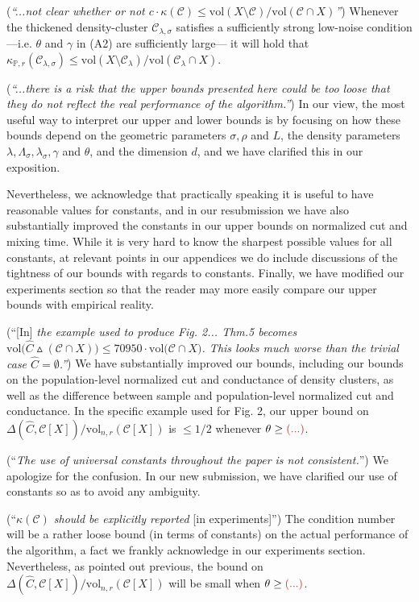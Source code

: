 \documentclass{article}
\newcommand{\vol}{\mathrm{vol}}
\newcommand{\1}{\mathbf{1}}
\newcommand{\mc}[1]{\mathcal{#1}}
\newcommand{\Pbb}{\mathbb{P}}
\newcommand{\wh}[1]{\widehat{#1}}
\theoremstyle{alden}
\theoremstyle{aldenthm}
\theoremstyle{definition}
\theoremstyle{remark}
\begin{document}
(\textit{``...not clear whether or not $c \cdot \kappa(\mc{C}) \leq \vol(X \setminus \mc{C}) / \vol(\mc{C} \cap X)$''}) Whenever the thickened density-cluster $\mc{C}_{\lambda,\sigma}$ satisfies a sufficiently strong low-noise condition---i.e. $\theta$ and $\gamma$ in (A2) are sufficiently large--- it will hold that $\kappa_{\Pbb,r}(\mc{C}_{\lambda,\sigma}) \leq \vol(X \setminus \mc{C}_{\lambda}) / \vol(\mc{C}_{\lambda} \cap X)$.

(\textit{``...there is a risk that the upper bounds presented here could be too loose that they do not reflect the real performance of the algorithm.''}) In our view, the most useful way to interpret our upper and lower bounds is by focusing on how these bounds depend on the geometric parameters $\sigma, \rho$ and $L$, the density parameters $\lambda,\Lambda_{\sigma},\lambda_{\sigma},\gamma$ and $\theta$, and the dimension $d$, and we have clarified this in our exposition. 

Nevertheless, we acknowledge that practically speaking it is useful to have reasonable values for constants, and in our resubmission we have also substantially improved the constants in our upper bounds on normalized cut and mixing time. While it is very hard to know the sharpest possible values for all constants, at relevant points in our appendices we do include discussions of the tightness of our bounds with regards to constants. Finally, we have modified our experiments section so that the reader may more easily compare our upper bounds with empirical reality.

(``[In] \textit{the example used to produce Fig. 2... Thm.5 becomes $\vol\bigl(\wh{C} \vartriangle (\mc{C} \cap X)\bigr) \leq 70950 \cdot \vol\bigl(\mc{C} \cap X\bigr)$. This looks much worse than the trivial case $\wh{C} = \emptyset$.''}) We have substantially improved our bounds, including our bounds on the population-level normalized cut and conductance of density clusters, as well as the difference between sample and population-level normalized cut and conductance. In the specific example used for Fig. 2, our upper bound on $\Delta(\wh{C},\mc{C}[X])/\vol_{n,r}(\mc{C}[X])$ is $\leq 1/2$ whenever $\theta \geq \textcolor{red}{(...)}$.

(``\textit{The use of universal constants throughout the paper is not consistent.}'') We apologize for the confusion. In our new submission, we have clarified our use of constants so as to avoid any ambiguity. 

(``\textit{$\kappa(\mc{C})$ should be explicitly reported} [in experiments]'') The condition number will be a rather loose bound (in terms of constants) on the actual performance of the algorithm, a fact we frankly acknowledge in our experiments section. Nevertheless, as pointed out previous, the bound on $\Delta(\wh{C},\mc{C}[X])/\vol_{n,r}(\mc{C}[X])$ will be small when $\theta \geq \textcolor{red}{(...)}$. 
\end{document}
